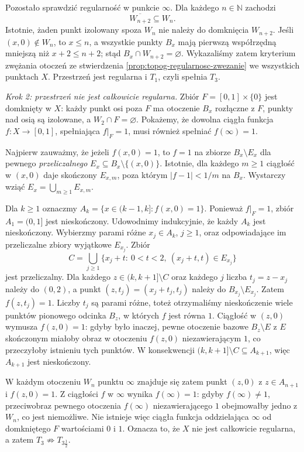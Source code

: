 \begin{przyklad}
Pozostało sprawdzić regularność w punkcie $\infty$.
Dla każdego $n\in\mathbb N$ zachodzi
\[
\overline{W_{n+2}}\subseteq W_n.
\]
Istotnie, żaden punkt izolowany spoza $W_n$ nie należy
do domknięcia $W_{n+2}$. Jeśli $(x,0)\notin W_n$,
to $x\le n$, a wszystkie punkty $B_x$ mają
pierwszą współrzędną mniejszą niż $x+2\le n+2$;
stąd $B_x\cap W_{n+2}=\varnothing$.
Wykazaliśmy zatem kryterium zwężania otoczeń
ze stwierdzenia \ref{prop:topog-regularnosc-zwezanie}
we wszystkich punktach $X$.
Przestrzeń jest regularna i $T_1$, czyli spełnia $T_3$.

\emph{Krok 2: przestrzeń nie jest całkowicie regularna.}
Zbiór $F=[0,1]\times\{0\}$ jest domknięty w $X$:
każdy punkt osi poza $F$ ma otoczenie $B_x$ rozłączne
z $F$, punkty nad osią są izolowane, a $W_2\cap F=\varnothing$.
Pokażemy, że dowolna ciągła funkcja
$f\colon X\to[0,1]$, spełniająca $f|_F=1$,
musi również spełniać $f(\infty)=1$.

Najpierw zauważmy, że jeżeli $f(x,0)=1$, to
$f=1$ na zbiorze $B_x\setminus E_x$ dla pewnego
\emph{przeliczalnego} $E_x\subseteq B_x\setminus\{(x,0)\}$.
Istotnie, dla każdego $m\ge1$ ciągłość w $(x,0)$
daje skończony $E_{x,m}$, poza którym
$|f-1|<1/m$ na $B_x$. Wystarczy wziąć
$E_x=\bigcup_{m\ge1}E_{x,m}$.

Dla $k\ge1$ oznaczmy
$A_k=\{x\in(k-1,k]:f(x,0)=1\}$.
Ponieważ $f|_F=1$, zbiór $A_1=(0,1]$ jest nieskończony.
Udowodnimy indukcyjnie, że każdy $A_k$ jest nieskończony.
Wybierzmy parami różne $x_j\in A_k$, $j\ge1$,
oraz odpowiadające im przeliczalne zbiory wyjątkowe $E_{x_j}$.
Zbiór
\[
C=\bigcup_{j\ge1}\{x_j+t:\ 0<t<2,\ (x_j+t,t)\in E_{x_j}\}
\]
jest przeliczalny. Dla każdego
$z\in(k,k+1]\setminus C$ oraz każdego $j$
liczba $t_j=z-x_j$ należy do $(0,2)$,
a punkt $(z,t_j)=(x_j+t_j,t_j)$ należy do
$B_{x_j}\setminus E_{x_j}$. Zatem $f(z,t_j)=1$.
Liczby $t_j$ są parami różne, toteż otrzymaliśmy
nieskończenie wiele punktów pionowego odcinka
$B_z$, w których $f$ jest równa $1$.
Ciągłość w $(z,0)$ wymusza $f(z,0)=1$:
gdyby było inaczej, pewne otoczenie bazowe
$B_z\setminus E$ z $E$ skończonym miałoby
obraz w otoczeniu $f(z,0)$ niezawierającym $1$,
co przeczyłoby istnieniu tych punktów.
W konsekwencji
$(k,k+1]\setminus C\subseteq A_{k+1}$,
więc $A_{k+1}$ jest nieskończony.

W każdym otoczeniu $W_n$ punktu $\infty$ znajduje się
zatem punkt $(z,0)$ z $z\in A_{n+1}$ i $f(z,0)=1$.
Z ciągłości $f$ w $\infty$ wynika $f(\infty)=1$:
gdyby $f(\infty)\ne1$, przeciwobraz pewnego otoczenia
$f(\infty)$ niezawierającego $1$ obejmowałby
jedno z $W_n$, co jest niemożliwe.
Nie istnieje więc ciągła funkcja oddzielająca
$\infty$ od domkniętego $F$ wartościami $0$ i $1$.
Oznacza to, że $X$ nie jest całkowicie regularna,
a zatem $T_3\not\Rightarrow T_{3\frac12}$.
\end{przyklad}

